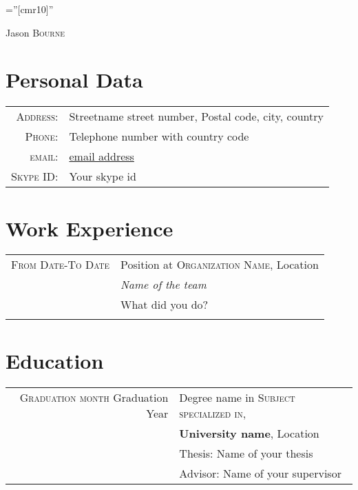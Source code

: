 \documentclass[a4paper,10pt]{article}
\begin{document}

\pagestyle{empty} %

\font\fb=''[cmr10]'' %

\par{\centering
		{\Huge Jason \textsc{Bourne}
	}\bigskip\par}

\section{Personal Data}

\begin{tabular}{rl}
    \textsc{Address:}   & Streetname street number, Postal code, city, country \\
    \textsc{Phone:}     & Telephone number with country code\\
    \textsc{email:}     & \href{mailto:email address}{email address}\\
    \textsc{Skype ID:}     & Your skype id\\
\end{tabular}

\section{Work Experience}
\begin{tabular}{r|p{11cm}}
 \textsc{From Date-To Date} & Position at \textsc{Organization Name}, Location \\&\emph{Name of the team}\\&\footnotesize{What did you do?}\\\multicolumn{2}{c}{} \\
 
\end{tabular}

\section{Education}
\begin{tabular}{rl}	
 \textsc{Graduation month} Graduation Year & Degree name in \textsc{Subject specialized in},\\& \textbf{University name}, Location\\
& Thesis: Name of your thesis \\& Advisor: {Name of your supervisor}
\end{tabular}
\end{document}
